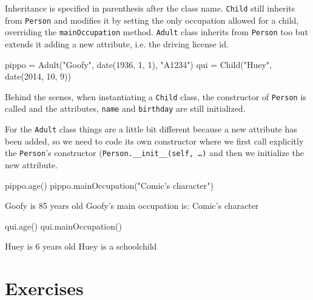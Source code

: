 Inheritance is specified in parenthesis after the class name. \texttt{Child} still inherits from \texttt{Person} and modifies it by setting the only occupation allowed for a child, overriding the \texttt{mainOccupation} method. \texttt{Adult} class inherits from \texttt{Person} too but extends it adding a new attribute, i.e. the driving license id. 

\begin{ipythonnon}
pippo = Adult("Goofy", date(1936, 1, 1), "A1234")
qui = Child("Huey", date(2014, 10, 9))
\end{ipythonnon}

Behind the scenes, when instantiating a \texttt{Child} class, the constructor of \texttt{Person} is called and the attributes, \texttt{name} and \texttt{birthday} are still initialized.  

For the \texttt{Adult} class things are a little bit different because a new attribute has been added, so we need to code its own constructor where we first call explicitly the \texttt{Person}'s constructor (\texttt{Person.\_\_init\_\_(self, \ldots)} and then we initialize the new attribute.

\begin{ipythonnon}
pippo.age()
pippo.mainOccupation("Comic's character")
\end{ipythonnon}
\begin{ioutput}
Goofy is 85 years old
Goofy's main occupation is: Comic's character
\end{ioutput}

\begin{ipythonnon}
qui.age()
qui.mainOccupation()
\end{ipythonnon}
\begin{ioutput}
Huey is 6 years old
Huey is a schoolchild
\end{ioutput}

\section*{Exercises}

